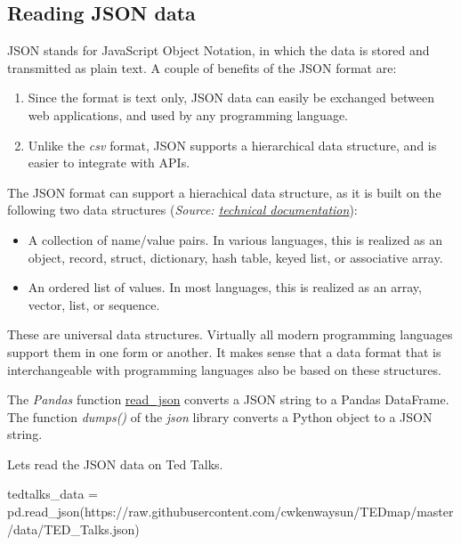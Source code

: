 \documentclass[
  letterpaper,
  DIV=11,
  numbers=noendperiod]{scrreprt}
\newenvironment{Shaded}{\begin{snugshade}}{\end{snugshade}}
\newcommand{\NormalTok}[1]{\textcolor[rgb]{0.00,0.23,0.31}{#1}}
\newcommand{\OperatorTok}[1]{\textcolor[rgb]{0.37,0.37,0.37}{#1}}
\newcommand{\StringTok}[1]{\textcolor[rgb]{0.13,0.47,0.30}{#1}}
\providecommand{\tightlist}{%
  \setlength{\itemsep}{0pt}\setlength{\parskip}{0pt}}\usepackage{longtable,booktabs,array}
\begin{document}
\hypertarget{reading-json-data}{%
\subsection{Reading JSON data}\label{reading-json-data}}

JSON stands for JavaScript Object Notation, in which the data is stored
and transmitted as plain text. A couple of benefits of the JSON format
are:

\begin{enumerate}
\def\labelenumi{\arabic{enumi}.}
\item
  Since the format is text only, JSON data can easily be exchanged
  between web applications, and used by any programming language.
\item
  Unlike the \emph{csv} format, JSON supports a hierarchical data
  structure, and is easier to integrate with APIs.
\end{enumerate}

The JSON format can support a hierachical data structure, as it is built
on the following two data structures (\emph{Source:
\href{https://www.json.org/json-en.html}{technical documentation}}):

\begin{itemize}
\tightlist
\item
  A collection of name/value pairs. In various languages, this is
  realized as an object, record, struct, dictionary, hash table, keyed
  list, or associative array.
\item
  An ordered list of values. In most languages, this is realized as an
  array, vector, list, or sequence.
\end{itemize}

These are universal data structures. Virtually all modern programming
languages support them in one form or another. It makes sense that a
data format that is interchangeable with programming languages also be
based on these structures.

The \emph{Pandas} function
\href{https://pandas.pydata.org/docs/reference/api/pandas.read_json.html}{read\_json}
converts a JSON string to a Pandas DataFrame. The function
\emph{dumps()} of the \emph{json} library converts a Python object to a
JSON string.

Lets read the JSON data on Ted Talks.

\begin{Shaded}
\begin{Highlighting}[]
\NormalTok{tedtalks\_data }\OperatorTok{=}\NormalTok{ pd.read\_json(}\StringTok{\textquotesingle{}https://raw.githubusercontent.com/cwkenwaysun/TEDmap/master/data/TED\_Talks.json\textquotesingle{}}\NormalTok{)}
\end{Highlighting}
\end{Shaded}
\end{document}
